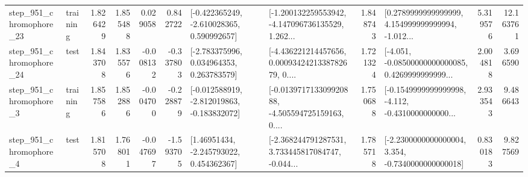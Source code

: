 \begin{tabular}{llrrrrllrlrr}
  step\_951\_chromophore\_23 &  training &      1.826429 &    1.855488 &      0.029058 &  0.842722 &   [-0.422365249, -2.610028365, 0.590992657] &  [-1.200132259553942, -4.147096736135529, 1.262... &       1.848743 &  [0.2789999999999999, 4.154999999999994, -1.012... &            5.319576 &         12.163761 \\
  step\_951\_chromophore\_24 &      test &      1.843708 &    1.835576 &     -0.008132 & -0.337803 &    [-2.783375996, 0.034964353, 0.263783579] &  [-4.436221214457656, 0.0009342421338782679, 0.... &       1.721324 &  [-4.051, -0.08500000000000085, 0.4269999999999... &            2.004818 &          3.696590 \\
   step\_951\_chromophore\_3 &  training &      1.857586 &    1.852886 &     -0.004700 & -0.228879 &  [-0.012588919, -2.812019863, -0.183832072] &  [-0.013971713309920888, -4.505594725159163, 0.... &       1.750688 &  [-0.1549999999999998, -4.112, -0.4310000000000... &            2.933543 &          9.486643 \\
   step\_951\_chromophore\_4 &      test &      1.815708 &    1.768011 &     -0.047697 & -1.593705 &     [1.46951434, -2.245793022, 0.454362367] &  [-2.368244791287531, 3.733445817084747, -0.044... &       1.785718 &  [-2.2300000000000004, 3.354, -0.7340000000000018] &            0.830183 &          9.827569 \\
\bottomrule
\end{tabular}

